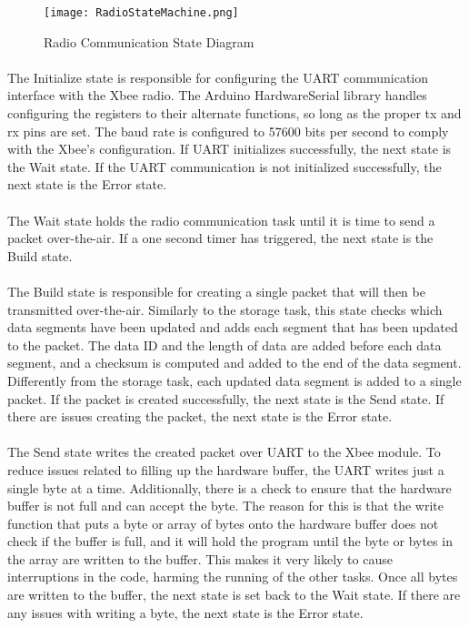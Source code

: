 \begin{figure}[H]
	\centering
	\texttt{[image: RadioStateMachine.png]}
	\caption{Radio Communication State Diagram}
	\label{fig:RadioDiagram}
\end{figure}

\paragraph{}
The Initialize state is responsible for configuring the UART communication interface with the Xbee radio.
The Arduino HardwareSerial library handles configuring the registers to their alternate functions, so long as the proper tx and rx pins are set.
The baud rate is configured to 57600 bits per second to comply with the Xbee's configuration.
If UART initializes successfully, the next state is the Wait state.
If the UART communication is not initialized successfully, the next state is the Error state.

\paragraph{}
The Wait state holds the radio communication task until it is time to send a packet over-the-air.
If a one second timer has triggered, the next state is the Build state.

\paragraph{}
The Build state is responsible for creating a single packet that will then be transmitted over-the-air.
Similarly to the storage task, this state checks which data segments have been updated and adds each segment that has been updated to the packet.
The data ID and the length of data are added before each data segment, and a checksum is computed and added to the end of the data segment.
Differently from the storage task, each updated data segment is added to a single packet.
If the packet is created successfully, the next state is the Send state.
If there are issues creating the packet, the next state is the Error state.

\paragraph{}
The Send state writes the created packet over UART to the Xbee module.
To reduce issues related to filling up the hardware buffer, the UART writes just a single byte at a time.
Additionally, there is a check to ensure that the hardware buffer is not full and can accept the byte.
The reason for this is that the write function that puts a byte or array of bytes onto the hardware buffer does not check if the buffer is full, and it will hold the program until the byte or bytes in the array are written to the buffer.
This makes it very likely to cause interruptions in the code, harming the running of the other tasks.
Once all bytes are written to the buffer, the next state is set back to the Wait state.
If there are any issues with writing a byte, the next state is the Error state.

